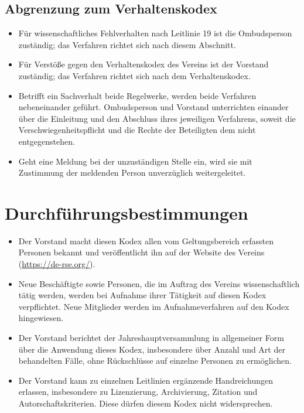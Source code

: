 \documentclass[a4paper, fontsize=11pt]{scrartcl}
\begin{document}
\subsection{Abgrenzung zum Verhaltenskodex}
\begin{itemize}
  \item Für wissenschaftliches Fehlverhalten nach Leitlinie 19 ist die Ombudsperson zuständig; das Verfahren richtet sich nach diesem Abschnitt.
  \item Für Verstöße gegen den Verhaltenskodex des Vereins ist der Vorstand zuständig; das Verfahren richtet sich nach dem Verhaltenskodex.
  \item Betrifft ein Sachverhalt beide Regelwerke, werden beide Verfahren nebeneinander geführt. Ombudsperson und Vorstand unterrichten einander über die Einleitung und den Abschluss ihres jeweiligen Verfahrens, soweit die Verschwiegenheitspflicht und die Rechte der Beteiligten dem nicht entgegenstehen.
  \item Geht eine Meldung bei der unzuständigen Stelle ein, wird sie mit Zustimmung der meldenden Person unverzüglich weitergeleitet.
\end{itemize}

\section{Durchführungsbestimmungen}
\begin{itemize}
  \item Der Vorstand macht diesen Kodex allen vom Geltungsbereich erfassten Personen bekannt und veröffentlicht ihn auf der Website des Vereins (\url{https://de-rse.org/}).
  \item Neue Beschäftigte sowie Personen, die im Auftrag des Vereins wissenschaftlich tätig werden, werden bei Aufnahme ihrer Tätigkeit auf diesen Kodex verpflichtet. Neue Mitglieder werden im Aufnahmeverfahren auf den Kodex hingewiesen.
  \item Der Vorstand berichtet der Jahreshauptversammlung in allgemeiner Form über die Anwendung dieses Kodex, insbesondere über Anzahl und Art der behandelten Fälle, ohne Rückschlüsse auf einzelne Personen zu ermöglichen.
  \item Der Vorstand kann zu einzelnen Leitlinien ergänzende Handreichungen erlassen, insbesondere zu Lizenzierung, Archivierung, Zitation und Autorschaftskriterien. Diese dürfen diesem Kodex nicht widersprechen.
\end{itemize}
\end{document}
